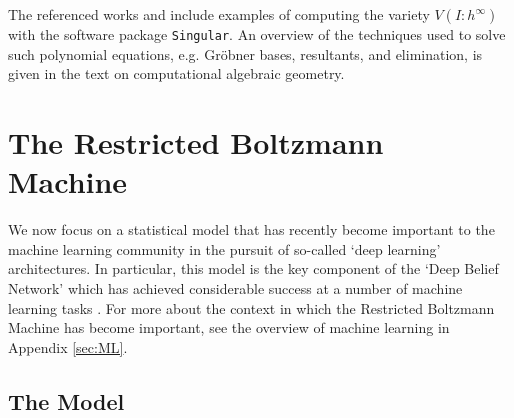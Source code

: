 \documentclass[11pt,titlepage]{article}
\numberwithin{equation}{section}
\begin{document}
    The referenced works \cite{ASCB} and \cite{DSS08} include examples of
    computing the variety $V(I : h^\infty)$ with the software package
    \texttt{Singular}.  An overview of the techniques used to solve such
    polynomial equations, e.g. Gröbner bases, resultants, and elimination, is
    given in the text \cite{CLO05} on computational algebraic geometry.
% 






\section{The Restricted Boltzmann Machine}

    We now focus on a statistical model that has recently become important to
    the machine learning community in the pursuit of so-called `deep learning'
    architectures.  In particular, this model is the key component of the `Deep
    Belief Network' which has achieved considerable success at a number of
    machine learning tasks \cite{Hin07}.  For more about the context in which
    the Restricted Boltzmann Machine has become important, see the overview of
    machine learning in Appendix \ref{sec:ML}.

\subsection{The Model}
    \label{sec:rbm-def}
\end{document}
